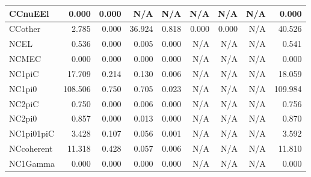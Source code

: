\begin{table}
\begin{adjustbox}{width=1\textwidth}
\begin{tabular} {l r r r r r r r r}
        \\ \hline
 CCnuEEl      & 0.000                & 0.000                & N/A                  & N/A                  & N/A                  & N/A                  & N/A                  & 0.000        
        \\ \hline
 CCother      & 2.785                & 0.000                & 36.924               & 0.818                & 0.000                & 0.000                & N/A                  & 40.526       
        \\ \hline
 NCEL         & 0.536                & 0.000                & 0.005                & 0.000                & N/A                  & N/A                  & N/A                  & 0.541        
        \\ \hline
 NCMEC        & 0.000                & 0.000                & 0.000                & 0.000                & N/A                  & N/A                  & N/A                  & 0.000        
        \\ \hline
 NC1piC       & 17.709               & 0.214                & 0.130                & 0.006                & N/A                  & N/A                  & N/A                  & 18.059       
        \\ \hline
 NC1pi0       & 108.506              & 0.750                & 0.705                & 0.023                & N/A                  & N/A                  & N/A                  & 109.984      
        \\ \hline
 NC2piC       & 0.750                & 0.000                & 0.006                & 0.000                & N/A                  & N/A                  & N/A                  & 0.756        
        \\ \hline
 NC2pi0       & 0.857                & 0.000                & 0.013                & 0.000                & N/A                  & N/A                  & N/A                  & 0.870        
        \\ \hline
 NC1pi01piC   & 3.428                & 0.107                & 0.056                & 0.001                & N/A                  & N/A                  & N/A                  & 3.592        
        \\ \hline
 NCcoherent   & 11.318               & 0.428                & 0.057                & 0.006                & N/A                  & N/A                  & N/A                  & 11.810       
        \\ \hline
 NC1Gamma     & 0.000                & 0.000                & 0.000                & 0.000                & N/A                  & N/A                  & N/A                  & 0.000        

\end{tabular}
\end{adjustbox}
\end{table}
